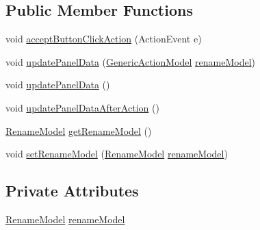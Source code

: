 \subsection*{Public Member Functions}
\begin{DoxyCompactItemize}
\item 
void \hyperlink{classcom_1_1poly_1_1nlp_1_1filekommander_1_1views_1_1panels_1_1_rename_action_panel_a26c8743087944fc57a101d402e9bb95f}{accept\-Button\-Click\-Action} (Action\-Event e)
\item 
void \hyperlink{classcom_1_1poly_1_1nlp_1_1filekommander_1_1views_1_1panels_1_1_rename_action_panel_a2f33f44eac5a0bfada8bbc901a8ff57b}{update\-Panel\-Data} (\hyperlink{interfacecom_1_1poly_1_1nlp_1_1filekommander_1_1views_1_1models_1_1_generic_action_model}{Generic\-Action\-Model} \hyperlink{classcom_1_1poly_1_1nlp_1_1filekommander_1_1views_1_1panels_1_1_rename_action_panel_a6225fd2a8c41ace06f7cbf690ff1fa66}{rename\-Model})
\item 
void \hyperlink{classcom_1_1poly_1_1nlp_1_1filekommander_1_1views_1_1panels_1_1_rename_action_panel_aaf4b583b76444aa394edf3fe64a37ae1}{update\-Panel\-Data} ()
\item 
void \hyperlink{classcom_1_1poly_1_1nlp_1_1filekommander_1_1views_1_1panels_1_1_rename_action_panel_a9defdeb4b3f825b7bd34081700b92e10}{update\-Panel\-Data\-After\-Action} ()
\item 
\hyperlink{classcom_1_1poly_1_1nlp_1_1filekommander_1_1views_1_1models_1_1_rename_model}{Rename\-Model} \hyperlink{classcom_1_1poly_1_1nlp_1_1filekommander_1_1views_1_1panels_1_1_rename_action_panel_ab2b8d0b3c213d7df75ffda2a5055fbe1}{get\-Rename\-Model} ()
\item 
void \hyperlink{classcom_1_1poly_1_1nlp_1_1filekommander_1_1views_1_1panels_1_1_rename_action_panel_a0093d0870dbf68f86129a6350ba85b76}{set\-Rename\-Model} (\hyperlink{classcom_1_1poly_1_1nlp_1_1filekommander_1_1views_1_1models_1_1_rename_model}{Rename\-Model} \hyperlink{classcom_1_1poly_1_1nlp_1_1filekommander_1_1views_1_1panels_1_1_rename_action_panel_a6225fd2a8c41ace06f7cbf690ff1fa66}{rename\-Model})
\end{DoxyCompactItemize}
\subsection*{Private Attributes}
\begin{DoxyCompactItemize}
\item 
\hyperlink{classcom_1_1poly_1_1nlp_1_1filekommander_1_1views_1_1models_1_1_rename_model}{Rename\-Model} \hyperlink{classcom_1_1poly_1_1nlp_1_1filekommander_1_1views_1_1panels_1_1_rename_action_panel_a6225fd2a8c41ace06f7cbf690ff1fa66}{rename\-Model}
\end{DoxyCompactItemize}

